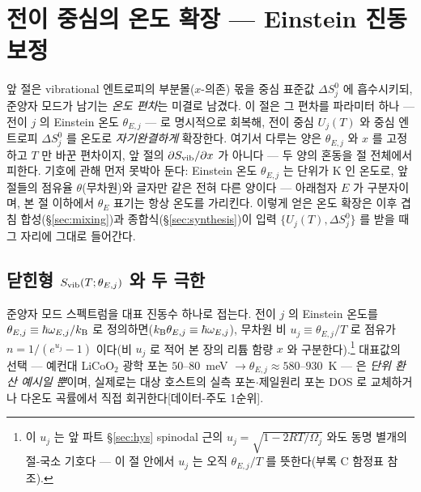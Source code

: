 \section{전이 중심의 온도 확장 --- Einstein 진동 보정}\label{sec:einstein}

앞 절은 vibrational 엔트로피의 부분몰($x$-의존) 몫을 중심 표준값 $\Delta S^0_j$ 에 흡수시키되, 준양자 모드가
남기는 \emph{온도 편차}는 미결로 남겼다. 이 절은 그 편차를 파라미터 하나 --- 전이 $j$ 의 Einstein 온도
$\theta_{E,j}$ --- 로 명시적으로 회복해, 전이 중심 $U_j(T)$ 와 중심 엔트로피 $\Delta S^0_j$ 를 온도로
\emph{자기완결하게} 확장한다. 여기서 다루는 양은 $\theta_{E,j}$ 와 $x$ 를 고정하고 $T$ 만 바꾼 편차이지, 앞
절의 $\partial S_{\mathrm{vib}}/\partial x$ 가 아니다 --- 두 양의 혼동을 절 전체에서 피한다. 기호에 관해 먼저 못박아
둔다: Einstein 온도 $\theta_{E,j}$ 는 단위가 K 인 온도로, 앞 절들의 점유율 $\theta$(무차원)와 글자만 같은
전혀 다른 양이다 --- 아래첨자 $E$ 가 구분자이며, 본 절 이하에서 $\theta_E$ 표기는 항상 온도를 가리킨다.
이렇게 얻은 온도 확장은 이후
겹침 합성(\S\ref{sec:mixing})과 종합식(\S\ref{sec:synthesis})이 입력 $\{U_j(T),\Delta S^0_j\}$ 를 받을 때 그
자리에 그대로 들어간다.

\subsection{닫힌형 $S_{\mathrm{vib}}(T;\theta_{E,j})$ 와 두 극한}\label{ssec:einstein-closed}
준양자 모드 스펙트럼을 대표 진동수 하나로 접는다. 전이 $j$ 의 Einstein 온도를 $\theta_{E,j}\equiv\hbar
\omega_{E,j}/k_{\mathrm B}$ 로 정의하면($k_{\mathrm B}\theta_{E,j}\equiv\hbar\omega_{E,j}$), 무차원 비 $u_j\equiv\theta_{E,j}/T$ 로
점유가 $n=1/(e^{u_j}-1)$ 이다(비 $u_j$ 로 적어 본 장의 리튬 함량 $x$ 와 구분한다).\footnote{이 $u_j$ 는
앞 파트 \S\ref{sec:hys} spinodal 근의 $u_j=\sqrt{1-2RT/\Omega_j}$ 와도 동명 별개의 절-국소 기호다 --- 이 절
안에서 $u_j$ 는 오직 $\theta_{E,j}/T$ 를 뜻한다(부록 C 함정표 참조).} 대표값의 선택 --- 예컨대
LiCoO$_2$ 광학 포논 $50$--$80$~meV $\to\theta_{E,j}\approx580$--$930$~K --- 은 \emph{단위 환산 예시일 뿐}이며,
실제로는 대상 호스트의 실측 포논$\cdot$제일원리 포논 DOS \cite{jpcc2021} 로 교체하거나 다온도 곡률에서 직접
회귀한다[데이터-주도 1순위].

